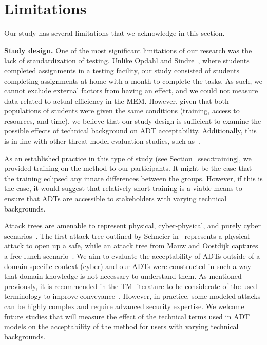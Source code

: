 \section{Limitations}\label{sec:limitations}
Our study has several limitations that we acknowledge in this section. 

\textbf{Study design.}
One of the most significant limitations of our research was the lack of standardization of testing. Unlike Opdahl and Sindre~\cite{opdahlExperimentalComparisonAttack2009}, where students completed assignments in a testing facility, our study consisted of students completing assignments at home with a month to complete the tasks. As such, we cannot exclude external factors from having an effect, and we could not measure data related to actual efficiency in the MEM. However, given that both populations of students were given the same conditions (training, access to resources, and time), we believe that our study design is sufficient to examine the possible effects of technical background on ADT acceptability. Additionally, this is in line with other threat model evaluation studies, such as~\cite{lallieEmpiricalEvaluationEffectiveness2017,broccia_assessing_2024}. 

As an established practice in this type of study (see Section~\ref{ssec:training}, we provided training on the method to our participants. It might be the case that the training eclipsed any innate differences between the groups. However, if this is the case, it would suggest that relatively short training is a viable means to ensure that ADTs are accessible to stakeholders with varying technical backgrounds. 


Attack trees are amenable to represent physical, cyber-physical, and purely cyber scenarios~\cite{shevchenko2018threat}. The first attack tree outlined by Schneier in~\cite[Fig. 1]{schneierAttackTrees1999} represents a physical attack to open up a safe, while an attack tree from Mauw and Oostdijk captures a free lunch scenario~\cite[Fig. 1]{mauwFoundationsAttackTrees2006}.  We aim to evaluate the acceptability of ADTs outside of a domain-specific context (cyber) and our ADTs were constructed in such a way that domain knowledge is not necessary to understand them. As mentioned previously, it is recommended in the TM literature to be considerate of the used terminology to improve conveyance~\cite{ingalsbe2008threat}. However, in practice, some modeled attacks can be highly complex and require advanced security expertise. We welcome future studies that will measure the effect of the technical terms used in ADT models on the acceptability of the method for users with varying technical backgrounds.


